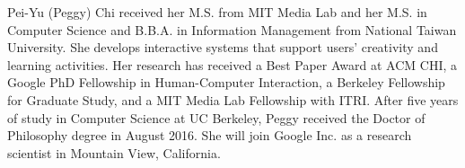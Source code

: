\markboth{}{}

Pei-Yu (Peggy) Chi received her M.S. from MIT Media Lab and her M.S. in Computer Science and B.B.A. in Information Management from National Taiwan University. She develops interactive systems that support users' creativity and learning activities. Her research has received a Best Paper Award at ACM CHI, a Google PhD Fellowship in Human-Computer Interaction, a Berkeley Fellowship for Graduate Study, and a MIT Media Lab Fellowship with ITRI.
%
After five years of study in Computer Science at UC Berkeley, Peggy received the Doctor of Philosophy degree in August 2016. She will join Google Inc. as a research scientist in Mountain View, California.

